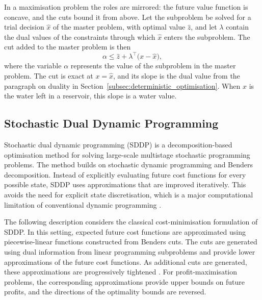 In a maximisation problem the roles are mirrored: the future value function is concave, and the cuts bound it from above. Let the subproblem be solved for a trial decision $\widehat{x}$ of the master problem, with optimal value $\widehat{z}$, and let $\lambda$ contain the dual values of the constraints through which $\widehat{x}$ enters the subproblem. The cut added to the master problem is then
\begin{equation}
\alpha\le\widehat{z}+\lambda^{\top}\bigl(x-\widehat{x}\bigr),
\label{eq:benders_cut}
\end{equation}
where the variable $\alpha$ represents the value of the subproblem in the master problem. The cut is exact at $x=\widehat{x}$, and its slope is the dual value from the paragraph on duality in Section~\ref{subsec:deterministic_optimisation}. When $x$ is the water left in a reservoir, this slope is a water value.


\subsection{Stochastic Dual Dynamic Programming}
\label{subsec:stochastic_dual_dynamic_programming}

Stochastic dual dynamic programming (SDDP) is a
decomposition-based optimisation method for solving
large-scale multistage stochastic programming problems.
The method builds on stochastic dynamic programming
and Benders decomposition. Instead of explicitly
evaluating future cost functions for every possible state,
SDDP uses approximations that are improved iteratively.
This avoids the need for explicit state discretisation,
which is a major computational limitation of conventional
dynamic programming
\parencite[p.~359]{pereiraPinto1991}.

The following description considers the classical
cost-minimisation formulation of SDDP. In this setting,
expected future cost functions are approximated using
piecewise-linear functions constructed from Benders cuts.
The cuts are generated using dual information from linear
programming subproblems and provide lower approximations
of the future cost functions. As additional cuts are
generated, these approximations are progressively tightened
\parencite[pp.~361--363]{pereiraPinto1991}.
For profit-maximisation problems, the corresponding
approximations provide upper bounds on future profits,
and the directions of the optimality bounds are reversed.

